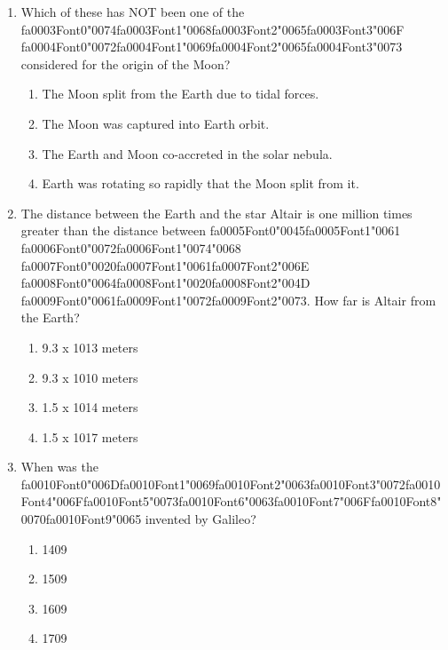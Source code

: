 \documentclass[12pt]{article}
\begin{document}
\begin{enumerate}[label=\arabic*.]
\item Which of these has NOT been one of the {\csname fa0003Font0\endcsname\char"0074}{\csname fa0003Font1\endcsname\char"0068}{\csname fa0003Font2\endcsname\char"0065}{\csname fa0003Font3\endcsname\char"006F} {\csname fa0004Font0\endcsname\char"0072}{\csname fa0004Font1\endcsname\char"0069}{\csname fa0004Font2\endcsname\char"0065}{\csname fa0004Font3\endcsname\char"0073} considered for the origin of the
Moon?
\begin{enumerate}[label=(\alph*)]
    \item The Moon split from the Earth due to tidal forces.
    \item The Moon was captured into Earth orbit.
    \item The Earth and Moon co-accreted in the solar nebula.
    \item Earth was rotating so rapidly that the Moon split from it.
\end{enumerate}
\item The distance between the Earth and the star Altair is one million times greater than the
distance between {\csname fa0005Font0\endcsname\char"0045}{\csname fa0005Font1\endcsname\char"0061} {\csname fa0006Font0\endcsname\char"0072}{\csname fa0006Font1\endcsname\char"0074}{\char"0068} {\csname fa0007Font0\endcsname\char"0020}{\csname fa0007Font1\endcsname\char"0061}{\csname fa0007Font2\endcsname\char"006E} {\csname fa0008Font0\endcsname\char"0064}{\csname fa0008Font1\endcsname\char"0020}{\csname fa0008Font2\endcsname\char"004D} {\csname fa0009Font0\endcsname\char"0061}{\csname fa0009Font1\endcsname\char"0072}{\csname fa0009Font2\endcsname\char"0073}. How far is Altair from the Earth?
\begin{enumerate}[label=(\alph*)]
    \item 9.3 x 1013 meters
    \item 9.3 x 1010 meters
    \item 1.5 x 1014 meters
    \item 1.5 x 1017 meters
\end{enumerate}
\item When was the {\csname fa0010Font0\endcsname\char"006D}{\csname fa0010Font1\endcsname\char"0069}{\csname fa0010Font2\endcsname\char"0063}{\csname fa0010Font3\endcsname\char"0072}{\csname fa0010Font4\endcsname\char"006F}{\csname fa0010Font5\endcsname\char"0073}{\csname fa0010Font6\endcsname\char"0063}{\csname fa0010Font7\endcsname\char"006F}{\csname fa0010Font8\endcsname\char"0070}{\csname fa0010Font9\endcsname\char"0065} invented by Galileo?
\begin{enumerate}[label=(\alph*)]
    \item 1409
    \item 1509
    \item 1609
    \item 1709
\end{enumerate}
\end{enumerate}
\end{document}
